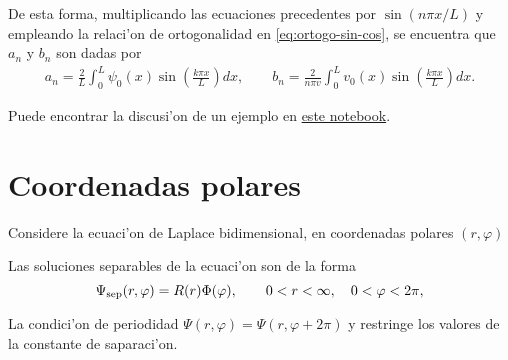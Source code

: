 De esta forma, multiplicando las ecuaciones precedentes por $\sin(n\pi x/L)$ y empleando la relaci'on de ortogonalidad en \eqref{eq:ortogo-sin-cos}, se encuentra que $a_{n}$ y $b_{n}$ son dadas por
\begin{align}
a_{n}=\frac{2}{L}\int_{0}^{L} \psi_{0}(x)\sin\left(\frac{k\pi x}{L}\right)dx, \qquad 
b_{n}=\frac{2}{n \pi v}\int_{0}^{L} v_{0}(x)\sin\left(\frac{k\pi x}{L}\right)dx.
\end{align}

Puede encontrar la discusi'on de un ejemplo en \href{https://github.com/gfrubi/FM2/blob/master/Notebooks/Ejemplo-MSV-Ecuacion-Onda-1D.ipynb}{este notebook}.
%
\section{Coordenadas polares}

Considere la ecuaci'on de Laplace bidimensional, en coordenadas polares $(r,\varphi)$


Las soluciones separables de la ecuaci'on son de la forma
\begin{equation}
\Psi_{\rm sep}(r,\varphi)=R(r)\Phi(\varphi), \qquad 0<r<\infty, \quad 0<\varphi<2\pi,
\end{equation}

La condici'on de periodidad $\Psi(r,\varphi)=\Psi(r,\varphi+2\pi)$ y restringe los valores de la constante de saparaci'on.

